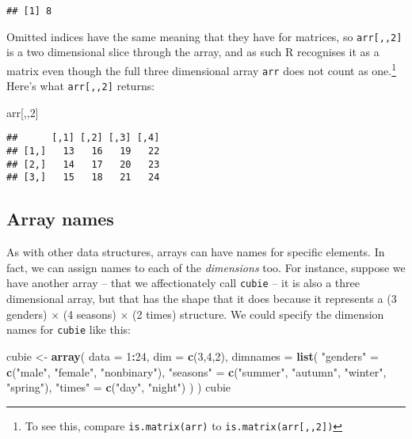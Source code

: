 \documentclass[]{book}
\newenvironment{Shaded}{\begin{snugshade}}{\end{snugshade}}
\newcommand{\DataTypeTok}[1]{\textcolor[rgb]{0.13,0.29,0.53}{#1}}
\newcommand{\DecValTok}[1]{\textcolor[rgb]{0.00,0.00,0.81}{#1}}
\newcommand{\KeywordTok}[1]{\textcolor[rgb]{0.13,0.29,0.53}{\textbf{#1}}}
\newcommand{\NormalTok}[1]{#1}
\newcommand{\OperatorTok}[1]{\textcolor[rgb]{0.81,0.36,0.00}{\textbf{#1}}}
\newcommand{\StringTok}[1]{\textcolor[rgb]{0.31,0.60,0.02}{#1}}
\let\rmarkdownfootnote\footnote%
\def\footnote{\protect\rmarkdownfootnote}
\begin{document}
\begin{verbatim}
## [1] 8
\end{verbatim}

Omitted indices have the same meaning that they have for matrices, so \texttt{arr{[},,2{]}} is a two dimensional slice through the array, and as such R recognises it as a matrix even though the full three dimensional array \texttt{arr} does not count as one.\footnote{To see this, compare \texttt{is.matrix(arr)} to \texttt{is.matrix(arr{[},,2{]})}} Here's what \texttt{arr{[},,2{]}} returns:

\begin{Shaded}
\begin{Highlighting}[]
\NormalTok{arr[,,}\DecValTok{2}\NormalTok{]}
\end{Highlighting}
\end{Shaded}

\begin{verbatim}
##      [,1] [,2] [,3] [,4]
## [1,]   13   16   19   22
## [2,]   14   17   20   23
## [3,]   15   18   21   24
\end{verbatim}

\hypertarget{array-names}{%
\subsection{Array names}\label{array-names}}

As with other data structures, arrays can have names for specific elements. In fact, we can assign names to each of the \emph{dimensions} too. For instance, suppose we have another array -- that we affectionately call \texttt{cubie} -- it is also a three dimensional array, but that has the shape that it does because it represents a (3 genders) \(\times\) (4 seasons) \(\times\) (2 times) structure. We could specify the dimension names for \texttt{cubie} like this:

\begin{Shaded}
\begin{Highlighting}[]
\NormalTok{cubie <-}\StringTok{ }\KeywordTok{array}\NormalTok{(}
  \DataTypeTok{data =} \DecValTok{1}\OperatorTok{:}\DecValTok{24}\NormalTok{, }
  \DataTypeTok{dim =} \KeywordTok{c}\NormalTok{(}\DecValTok{3}\NormalTok{,}\DecValTok{4}\NormalTok{,}\DecValTok{2}\NormalTok{), }
  \DataTypeTok{dimnames =} \KeywordTok{list}\NormalTok{(}
    \StringTok{"genders"}\NormalTok{ =}\StringTok{ }\KeywordTok{c}\NormalTok{(}\StringTok{"male"}\NormalTok{, }\StringTok{"female"}\NormalTok{, }\StringTok{"nonbinary"}\NormalTok{),}
    \StringTok{"seasons"}\NormalTok{ =}\StringTok{ }\KeywordTok{c}\NormalTok{(}\StringTok{"summer"}\NormalTok{, }\StringTok{"autumn"}\NormalTok{, }\StringTok{"winter"}\NormalTok{, }\StringTok{"spring"}\NormalTok{),}
    \StringTok{"times"}\NormalTok{ =}\StringTok{ }\KeywordTok{c}\NormalTok{(}\StringTok{"day"}\NormalTok{, }\StringTok{"night"}\NormalTok{)}
\NormalTok{    )}
\NormalTok{  )}
\NormalTok{cubie}
\end{Highlighting}
\end{Shaded}
\end{document}
